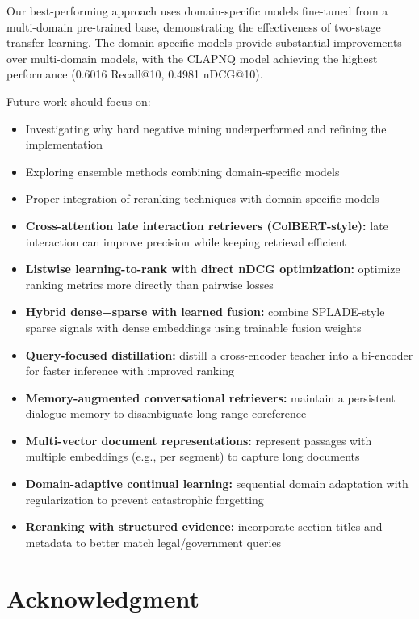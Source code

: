 \documentclass[11pt]{article}
\begin{document}
Our best-performing approach uses domain-specific models fine-tuned from a multi-domain pre-trained base, demonstrating the effectiveness of two-stage transfer learning. The domain-specific models provide substantial improvements over multi-domain models, with the CLAPNQ model achieving the highest performance (0.6016 Recall@10, 0.4981 nDCG@10).

Future work should focus on:
\begin{itemize}
    \item Investigating why hard negative mining underperformed and refining the implementation
    \item Exploring ensemble methods combining domain-specific models
    \item Proper integration of reranking techniques with domain-specific models
    \item \textbf{Cross-attention late interaction retrievers (ColBERT-style):} late interaction can improve precision while keeping retrieval efficient
    \item \textbf{Listwise learning-to-rank with direct nDCG optimization:} optimize ranking metrics more directly than pairwise losses
    \item \textbf{Hybrid dense+sparse with learned fusion:} combine SPLADE-style sparse signals with dense embeddings using trainable fusion weights
    \item \textbf{Query-focused distillation:} distill a cross-encoder teacher into a bi-encoder for faster inference with improved ranking
    \item \textbf{Memory-augmented conversational retrievers:} maintain a persistent dialogue memory to disambiguate long-range coreference
    \item \textbf{Multi-vector document representations:} represent passages with multiple embeddings (e.g., per segment) to capture long documents
    \item \textbf{Domain-adaptive continual learning:} sequential domain adaptation with regularization to prevent catastrophic forgetting
    \item \textbf{Reranking with structured evidence:} incorporate section titles and metadata to better match legal/government queries

\end{itemize}

\section*{Acknowledgment}
\end{document}
